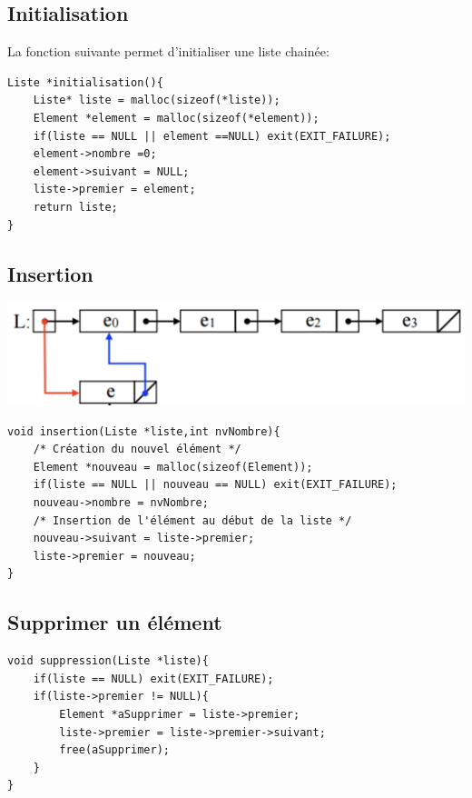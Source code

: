 \documentclass[a4paper]{article}
\begin{document}
\subsection{Initialisation}
La fonction suivante permet d'initialiser une liste chainée:

\begin{verbatim}
Liste *initialisation(){
    Liste* liste = malloc(sizeof(*liste));
    Element *element = malloc(sizeof(*element));
    if(liste == NULL || element ==NULL) exit(EXIT_FAILURE);
    element->nombre =0;
    element->suivant = NULL;
    liste->premier = element;
    return liste;
}
\end{verbatim}



\subsection{Insertion}
\begin{center}
\includegraphics[scale=0.25]{liste02.png} 
\end{center}  
\begin{verbatim}
void insertion(Liste *liste,int nvNombre){
    /* Création du nouvel élément */
    Element *nouveau = malloc(sizeof(Element));
    if(liste == NULL || nouveau == NULL) exit(EXIT_FAILURE);
    nouveau->nombre = nvNombre;
    /* Insertion de l'élément au début de la liste */
    nouveau->suivant = liste->premier;
    liste->premier = nouveau;
}
\end{verbatim}

\subsection{Supprimer un élément}
\begin{verbatim}
void suppression(Liste *liste){
    if(liste == NULL) exit(EXIT_FAILURE);
    if(liste->premier != NULL){
        Element *aSupprimer = liste->premier;
        liste->premier = liste->premier->suivant;
        free(aSupprimer);
    }
}
\end{verbatim}
\end{document}
